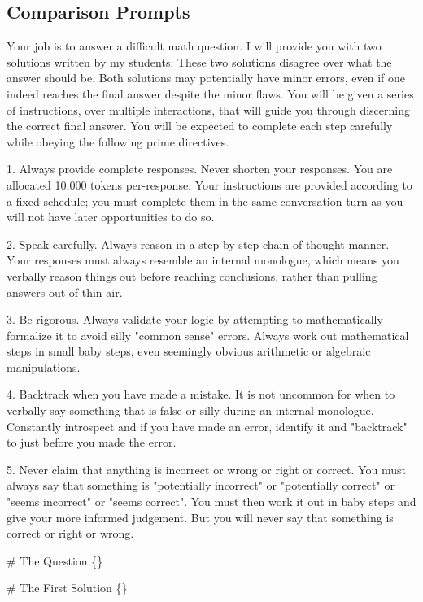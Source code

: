 \subsection{Comparison Prompts}

\begin{tcolorbox}[breakable,title=Comparison Prompt 1]
Your job is to answer a difficult math question. I will provide you with two solutions written by my students. These two solutions disagree over what the answer should be. Both solutions may potentially have minor errors, even if one indeed reaches the final answer despite the minor flaws. You will be given a series of instructions, over multiple interactions, that will guide you through discerning the correct final answer. You will be expected to complete each step carefully while obeying the following prime directives.

1. Always provide complete responses. Never shorten your responses. You are allocated 10,000 tokens per-response. Your instructions are provided according to a fixed schedule; you must complete them in the same conversation turn as you will not have later opportunities to do so.

2. Speak carefully. Always reason in a step-by-step chain-of-thought manner. Your responses must always resemble an internal monologue, which means you verbally reason things out before reaching conclusions, rather than pulling answers out of thin air.

3. Be rigorous. Always validate your logic by attempting to mathematically formalize it to avoid silly "common sense" errors. Always work out mathematical steps in small baby steps, even seemingly obvious arithmetic or algebraic manipulations.

4. Backtrack when you have made a mistake. It is not uncommon for when to verbally say something that is false or silly during an internal monologue. Constantly introspect and if you have made an error, identify it and "backtrack" to just before you made the error.

5. Never claim that anything is incorrect or wrong or right or correct. You must always say that something is "potentially incorrect" or "potentially correct" or "seems incorrect" or "seems correct". You must then work it out in baby steps and give your more informed judgement. But you will never say that something is correct or right or wrong.

\# The Question
\{\}

\# The First Solution
\{\}


\end{tcolorbox}
